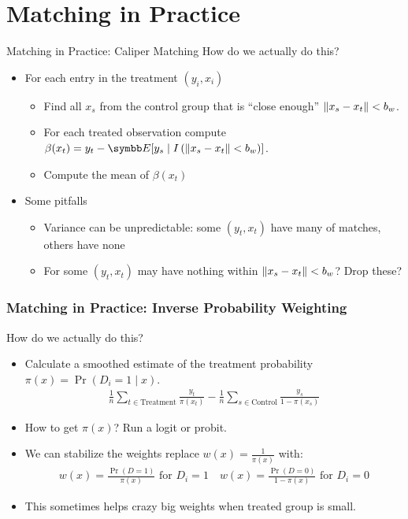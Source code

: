 \documentclass[aspectratio=169,11pt]{beamer}
\begin{document}
\section{Matching in Practice}



\begin{frame}{Matching in Practice: \alert{Caliper Matching}}
How do we actually do this?
\begin{itemize}
\item For each entry in the treatment $(y_i,x_i)$
\begin{itemize}
\item Find all $x_s$ from the control group that is ``close enough''  $\lVert x_s -x_t\rVert<b_w$.
\item For each treated observation compute $\beta(x_t) = y_t - \E[y_s \mid  I \left( \norm{x_s -x_t}<b_w\right)]$.
\item Compute the mean of $\beta(x_t)$
\end{itemize}
\item Some pitfalls
\begin{itemize}
\item Variance can be unpredictable: some $(y_t,x_t)$ have many of matches, others have none
\item For some $(y_t,x_t)$ may have nothing within $\lVert x_s -x_t\rVert<b_w$? Drop these?
\end{itemize}
\end{itemize}
\end{frame}

\begin{frame}
\frametitle{Matching in Practice: \alert{Inverse Probability Weighting}}
How do we actually do this?
\begin{itemize}
\item Calculate a smoothed estimate of the treatment probability $\pi(x) = \Pr(D_i =1 \mid x)$.
\begin{align*}
\frac{1}{n}\sum_{t \in \text{Treatment}} \frac{y_t}{\pi(x_t)} - \frac{1}{n} \sum_{s \in \text{Control}} \frac{y_s}{1-\pi(x_s)}
\end{align*}
\item How to get $\pi(x)$? Run a logit or probit.
\item We can stabilize the weights replace $w(x) =\frac{1}{\pi(x)}$ with:
\begin{align*}
w(x)=\frac{\Pr(D=1)}{\pi(x)}  \mbox{ for } D_i=1 \quad
w(x)=\frac{\Pr(D=0)}{1-\pi(x)} \mbox{ for } D_i=0
\end{align*}
\item This sometimes helps crazy big weights when treated group is small.
\end{itemize}
\end{frame}
\end{document}
